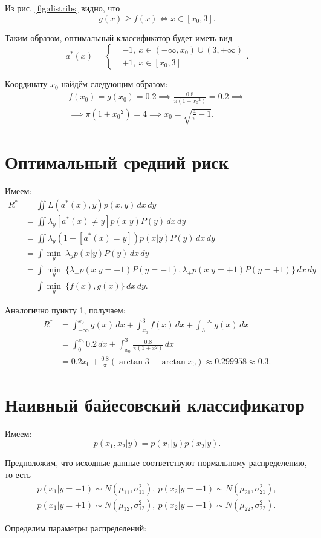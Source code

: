 \documentclass[14pt,a4paper]{article}
\begin{document}
	Из рис. \ref{fig:distribs} видно, что
	\[
		g(x) \geq f(x) \iff x \in [x_0, 3].
	\]
	
	Таким образом, оптимальный классификатор будет иметь вид
	\[
		a^*(x) = \left\{
		\begin{aligned}
			& -1, \ x \in (-\infty, x_0) \cup (3, +\infty) \\
			& +1, \ x \in [x_0, 3]
		\end{aligned}
		\right..
	\]
	
	Координату $x_0$ найдём следующим образом:
	\[
	\begin{gathered}
		f(x_0) = g(x_0) = 0.2 \implies \frac{0.8}{\pi (1 + {x_0}^2)} = 0.2 \implies \\
		\implies \pi (1 + {x_0}^2) = 4 \implies x_0 = \sqrt{\frac{4}{\pi} - 1}.
	\end{gathered}
	\]
	
    \section{Оптимальный средний риск}
    Имеем:
    \[
    	\begin{aligned}
    		R^* &= \iint L(a^*(x), y) p(x, y) \,dx\,dy \\
    		&= \iint \lambda_y [a^*(x) \neq y] p(x | y) P(y) \,dx\,dy \\
    		&= \iint \lambda_y (1 - [a^*(x) = y]) p(x | y) P(y) \,dx\,dy \\
    		&= \int \underset{y}{\min} \ \lambda_y p(x | y) P(y) \,dx\,dy \\
    		&= \int \underset{y}{\min} \ \{ \lambda_{-} p(x | y = -1) P(y = -1), \lambda_{+} p(x | y = +1) P(y = +1) \} \,dx\,dy \\
    		&= \int \underset{y}{\min} \ \{ f(x), g(x) \} \,dx\,dy.
    	\end{aligned}
    \]
    
    Аналогично пункту 1, получаем:
    \[
    	\begin{aligned}
    		R^* &= \int_{-\infty}^{x_0} g(x) \,dx + \int_{x_0}^{3} f(x) \,dx + \int_{3}^{+\infty} g(x) \,dx \\
    		&= \int_{0}^{x_0} 0.2 \,dx + \int_{x_0}^{3} \frac{0.8}{\pi (1 + x^2)} \,dx \\
    		&= 0.2 x_0 + \frac{0.8}{\pi} (\arctan{3} - \arctan{x_0}) \approx 0.299958 \approx 0.3.
    	\end{aligned}
    \]

    \section{Наивный байесовский классификатор}
    Имеем:
    \[
    	p(x_1, x_2 | y) = p(x_1 | y) p(x_2 | y).
    \]
    
    Предположим, что исходные данные соответствуют нормальному распределению, то есть
    \[
    	\begin{gathered}
    		p(x_1 | y = -1) \sim N(\mu_{11}, \sigma_{11}^2), \ p(x_2 | y = -1) \sim N(\mu_{21}, \sigma_{21}^2), \\
    		p(x_1 | y = +1) \sim N(\mu_{12}, \sigma_{12}^2), \ p(x_2 | y = +1) \sim N(\mu_{22}, \sigma_{22}^2).
    	\end{gathered}
    \]
    
    Определим параметры распределений:
    
\end{document}
